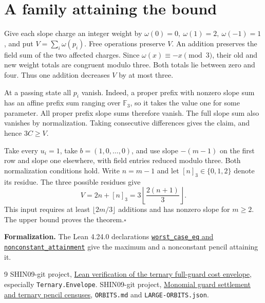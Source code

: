 \documentclass[a4paper,11pt]{article}
\newcommand{\F}{\mathbb F_3}
\newcommand{\cost}{\lfloor 2m/3\rfloor}
\begin{document}
\section{A family attaining the bound}
Give each slope charge an integer weight by
$\omega(0)=0,\ \omega(1)=2,\ \omega(-1)=1$, and put $V=\sum_i\omega(p_i)$.
Free operations preserve $V$. An addition preserves the field sum of the two affected charges. Since $\omega(x)\equiv-x\pmod3$, their old and new weight totals are congruent modulo three. Both totals lie between zero and four. Thus one addition decreases $V$ by at most three.

At a passing state all $p_i$ vanish. Indeed, a proper prefix with nonzero slope sum has an affine prefix sum ranging over $\F$, so it takes the value one for some parameter. All proper prefix slope sums therefore vanish. The full slope sum also vanishes by normalization. Taking consecutive differences gives the claim, and hence $3C\ge V$.

Take every $u_i=1$, take $b=(1,0,\ldots,0)$, and use slope $-(m-1)$ on the first row and slope one elsewhere, with field entries reduced modulo three. Both normalization conditions hold. Write $n=m-1$ and let $[n]_3\in\{0,1,2\}$ denote its residue. The three possible residues give
\[
             V=2n+[n]_3=3\left\lfloor\frac{2(n+1)}3\right\rfloor .
\]
This input requires at least $\cost$ additions and has nonzero slope for $m\ge2$. The upper bound proves the theorem.\hfill$\square$

\smallskip\noindent\textbf{Formalization.}
The Lean 4.24.0 declarations
\href{https://github.com/SHIN09-git/integer-mult-bounds/blob/codex/ternary-guard-affine-quotient/research/monomial-guard-affine-quotient/AffineGuard/OneParameter/WorstCase.lean}{\texttt{worst\_case\_eq} and \texttt{nonconstant\_attainment}}
give the maximum and a nonconstant pencil attaining it.

\begin{thebibliography}{9}\small
{} SHIN09-git project, \href{https://github.com/SHIN09-git/integer-mult-bounds/tree/5703e56d6eb4b4f0a83af8c23a5d1dddd0b5474f/research/monomial-guard-ternary-lean}{Lean verification of the ternary full-guard cost envelope}, especially \texttt{Ternary.Envelope}.
 SHIN09-git project, \href{https://github.com/SHIN09-git/integer-mult-bounds/tree/b6509f720197a2a760b8c06125e5bfc56bc736dd/research/monomial-guard-settlement}{Monomial guard settlement and ternary pencil censuses}, \texttt{ORBITS.md} and \texttt{LARGE-ORBITS.json}.
\end{thebibliography}
\end{document}
